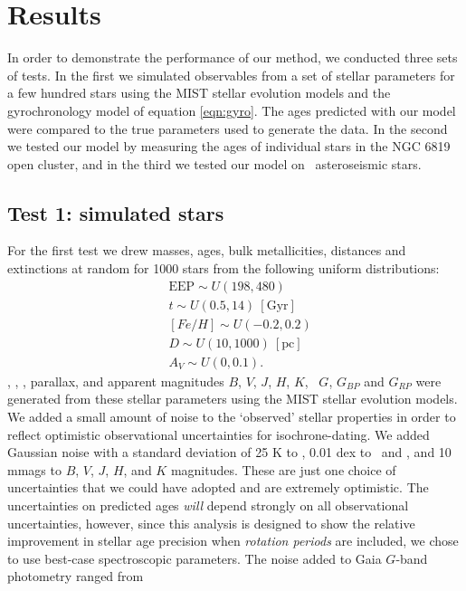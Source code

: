 \section{Results}
\label{section:results}

In order to demonstrate the performance of our method, we conducted three sets
of tests.
In the first we simulated observables from a set of stellar parameters for a
few hundred stars using the MIST stellar evolution models and the
gyrochronology model of equation \ref{eqn:gyro}.
The ages predicted with our model were compared to the true parameters used to
generate the data.
In the second we tested our model by measuring the ages of individual stars in
the NGC 6819 open cluster, and in the third we tested our model on \kepler\
asteroseismic stars.

\subsection{Test 1: simulated stars}
For the first test we drew masses, ages, bulk metallicities, distances and
extinctions at random for 1000 stars from the following uniform distributions:
\begin{eqnarray}
& \mathrm{EEP} \sim U(198, 480) \\
& t \sim U(0.5, 14)\mathrm{~[Gyr]} \\
& [Fe/H] \sim U(-0.2, 0.2) \\
& D \sim U(10, 1000)~\mathrm{[pc]} \\
& A_V \sim U(0, 0.1).
\end{eqnarray}
\teff, \logg, \fhat, parallax, and apparent magnitudes $B$, $V$, $J$, $H$, $K$,
\gaia\ $G$, $G_{BP}$ and $G_{RP}$ were generated from these
stellar parameters using the MIST stellar evolution models.
We added a small amount of noise to the `observed' stellar properties in order
to reflect optimistic observational uncertainties for isochrone-dating.
We added Gaussian noise with a standard deviation of 25 K to \teff, 0.01 dex
to \feh\ and \logg, and 10 mmags to $B$, $V$, $J$, $H$, and $K$ magnitudes.
These are just one choice of uncertainties that we could have adopted and are
extremely optimistic.
The uncertainties on predicted ages {\it will} depend strongly on all
observational uncertainties, however, since this analysis is designed to show
the relative improvement in stellar age precision when {\it rotation periods}
are included, we chose to use best-case spectroscopic parameters.
The noise added to Gaia $G$-band photometry ranged from
